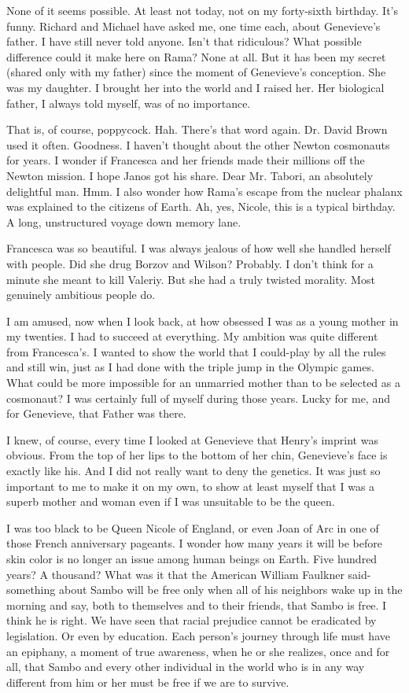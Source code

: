\documentclass[]{article}
\begin{document}
{None of it seems possible.  At least not today, not on my forty-sixth birthday.  It’s funny.  Richard and Michael have asked me, one time each, about Genevieve’s father.  I have still never told anyone.  Isn’t that ridiculous? What possible difference could it make here on Rama? None at all.  But it has been my secret (shared only with my father) since the moment of Genevieve’s conception.  She was my daughter.  I brought her into the world and I raised her.  Her biological father, I always told myself, was of no importance.

That is, of course, poppycock.  Hah.  There’s that word again.  Dr.  David Brown used it often.  Goodness.  I haven’t thought about the other Newton cosmonauts for years.  I wonder if Francesca and her friends made their millions off the Newton mission.  I hope Janos got his share.  Dear Mr.  Tabori, an absolutely delightful man.  Hmm.  I also wonder how Rama’s escape from the nuclear phalanx was explained to the citizens of Earth.  Ah, yes, Nicole, this is a typical birthday.  A long, unstructured voyage down memory lane.

Francesca was so beautiful.  I was always jealous of how well she handled herself with people.  Did she drug Borzov and Wilson? Probably.  I don’t think for a minute she meant to kill Valeriy.  But she had a truly twisted morality.  Most genuinely ambitious people do.

I am amused, now when I look back, at how obsessed I was as a young mother in my twenties.  I had to succeed at everything.  My ambition was quite different from Francesca’s.  I wanted to show the world that I could-play by all the rules and still win, just as I had done with the triple jump in the Olympic games.  What could be more impossible for an unmarried mother than to be selected as a cosmonaut? I was certainly full of myself during those years.  Lucky for me, and for Genevieve, that Father was there.

I knew, of course, every time I looked at Genevieve that Henry’s imprint was obvious.  From the top of her lips to the bottom of her chin, Genevieve’s face is exactly like his.  And I did not really want to deny the genetics.  It was just so important to me to make it on my own, to show at least myself that I was a superb mother and woman even if I was unsuitable to be the queen.

I was too black to be Queen Nicole of England, or even Joan of Arc in one of those French anniversary pageants.  I wonder how many years it will be before skin color is no longer an issue among human beings on Earth.  Five hundred years? A thousand? What was it that the American William Faulkner said-something about Sambo will be free only when all of his neighbors wake up in the morning and say, both to themselves and to their friends, that Sambo is free.  I think he is right.  We have seen that racial prejudice cannot be eradicated by legislation.  Or even by education.  Each person’s journey through life must have an epiphany, a moment of true awareness, when he or she realizes, once and for all, that Sambo and every other individual in the world who is in any way different from him or her must be free if we are to survive.

}
\end{document}
